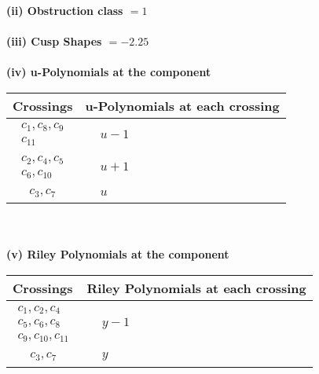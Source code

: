 \documentclass[1p]{elsarticle_modified}
\theoremstyle{definition}
\begin{document}
\flushleft \textbf{(ii) Obstruction class $= 1$}\\~\\
\flushleft \textbf{(iii) Cusp Shapes $= -2.25$}\\~\\
\newpage\renewcommand{\arraystretch}{1}
\flushleft \textbf{(iv) u-Polynomials at the component}\newline \\
\begin{tabular}{m{50pt}|m{274pt}}
Crossings & \hspace{64pt}u-Polynomials at each crossing \\
\hline $$\begin{aligned}c_{1},c_{8},c_{9}\\c_{11}\end{aligned}$$&$\begin{aligned}
&u-1
\end{aligned}$\\
\hline $$\begin{aligned}c_{2},c_{4},c_{5}\\c_{6},c_{10}\end{aligned}$$&$\begin{aligned}
&u+1
\end{aligned}$\\
\hline $$\begin{aligned}c_{3},c_{7}\end{aligned}$$&$\begin{aligned}
&u
\end{aligned}$\\
\hline
\end{tabular}\\~\\
\newpage\renewcommand{\arraystretch}{1}
\flushleft \textbf{(v) Riley Polynomials at the component}\newline \\
\begin{tabular}{m{50pt}|m{274pt}}
Crossings & \hspace{64pt}Riley Polynomials at each crossing \\
\hline $$\begin{aligned}c_{1},c_{2},c_{4}\\c_{5},c_{6},c_{8}\\c_{9},c_{10},c_{11}\end{aligned}$$&$\begin{aligned}
&y-1
\end{aligned}$\\
\hline $$\begin{aligned}c_{3},c_{7}\end{aligned}$$&$\begin{aligned}
&y
\end{aligned}$\\
\hline
\end{tabular}\\~\\
\end{document}
